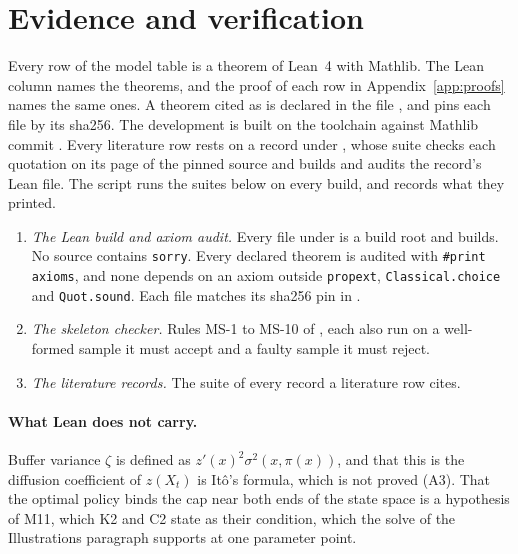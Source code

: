 \section{Evidence and verification}
\label{app:evidence}

Every row of the model table is a theorem of Lean~4 with Mathlib. The Lean
column names the theorems, and the proof of each row in
Appendix~\ref{app:proofs} names the same ones. A theorem cited as
 is declared in the file
, and  pins each
file by its sha256. The development is built on the toolchain
 against Mathlib commit . Every literature row
rests on a record under , whose suite checks each quotation
on its page of the pinned source and builds and audits the record's Lean file.
The script  runs the suites below on every build, and
 records what they printed.

\begin{enumerate}
\item \emph{The Lean build and axiom audit.} Every file under
 is a build root and builds. No source contains
\texttt{sorry}. Every declared theorem is audited with \texttt{\#print axioms},
and none depends on an axiom outside \texttt{propext},
\texttt{Classical.choice} and \texttt{Quot.sound}. Each file matches its
sha256 pin in .
\item \emph{The skeleton checker.} Rules MS-1 to MS-10 of
, each also run on a well-formed
sample it must accept and a faulty sample it must reject.
\item \emph{The literature records.} The suite of every record a literature
row cites.
\end{enumerate}

\paragraph{What Lean does not carry.} Buffer variance $\zeta$ is defined as
$z'(x)^2\sigma^2(x,\pi(x))$, and that this is the diffusion coefficient of
$z(X_t)$ is Itô's formula, which is not proved (A3). That the optimal policy
binds the cap near both ends of the state space is a hypothesis of M11, which
K2 and C2 state as their condition, which the solve of the Illustrations
paragraph supports at one parameter point.

